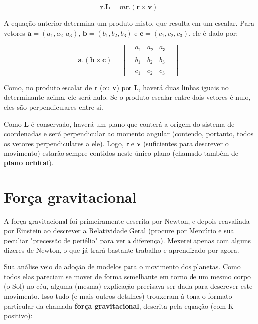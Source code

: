 \begin{equation}
	\mathbf{r.L} = m\mathbf{r}.(\mathbf{r} \times \mathbf{v}) \label{eq22}
\end{equation}

A equação anterior determina um produto misto, que resulta em um escalar. Para vetores $\mathbf{a} = (a_1, a_2, a_3)$, $\mathbf{b} = (b_1, b_2, b_3)$ e $\mathbf{c} = (c_1, c_2, c_3)$, ele é dado por:

\begin{equation}
	\mathbf{a . (b \times c)} = \begin{vmatrix} & a_1 & a_2 & a_3 &\\ \\&  b_1 & b_2 & b_3 &\\ \\ & c_1 & c_2 & c_3 &\end{vmatrix} 	\label{eq23}
\end{equation} 

Como, no produto escalar de \textbf{r} (ou \textbf{v}) por \textbf{L}, haverá duas linhas iguais no determinante acima, ele será nulo. Se o produto escalar entre dois vetores é nulo, eles são perpendiculares entre si.{\\}

Como \textbf{L} é conservado, haverá  um plano que conterá a origem do sistema de coordenadas e será perpendicular ao momento angular (contendo, portanto, todos os vetores perpendiculares a ele). Logo, \textbf{r} e \textbf{v} (suficientes para descrever o movimento) estarão sempre contidos neste único plano (chamado também de \textbf{plano orbital}). 

\section{Força gravitacional}

A força gravitacional foi primeiramente descrita por Newton, e depois reavaliada por Einstein ao descrever a Relatividade Geral (procure por Mercúrio e sua peculiar "precessão de periélio" para ver a diferença). Mexerei apenas com alguns dizeres de Newton, o que já trará bastante trabalho e aprendizado por agora. {\\}

Sua análise veio da adoção de modelos para o movimento dos planetas. Como todos elas pareciam se mover de forma semelhante em torno de um mesmo corpo (o Sol) no céu, alguma (mesma) explicação precisava ser dada para descrever este movimento. Isso tudo (e mais outros detalhes) trouxeram à tona o formato particular da chamada \textbf{força gravitacional}, descrita pela equação (com K positivo):

